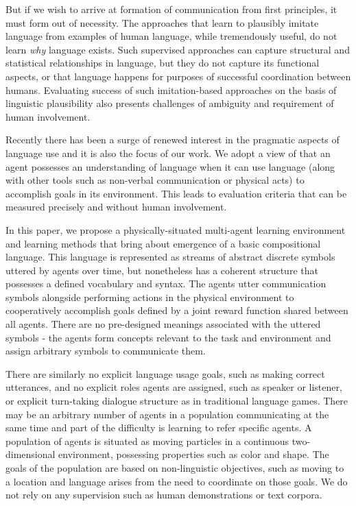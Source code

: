 \documentclass[letterpaper]{article} %
\begin{document}
But if we wish to arrive at formation of communication from first principles, it must form out of necessity. The approaches that learn to plausibly imitate language from examples of human language, while tremendously useful, do not learn \emph{why} language exists. Such supervised approaches can capture structural and statistical relationships in language, but they do not capture its functional aspects, or that language happens for purposes of successful coordination between humans. Evaluating success of such imitation-based approaches on the basis of linguistic plausibility also presents challenges of ambiguity and requirement of human involvement.

Recently there has been a surge of renewed interest in the pragmatic aspects of language use and it is also the focus of our work. We adopt a view of \cite{mordatch16} that an agent possesses an understanding of language when it can use language (along with other tools such as non-verbal communication or physical acts) to accomplish goals in its environment. This leads to evaluation criteria that can be measured precisely and without human involvement. 

In this paper, we propose a physically-situated multi-agent learning environment and learning methods that bring about emergence of a basic compositional language. This language is represented as streams of abstract discrete symbols uttered by agents over time, but nonetheless has a coherent structure that possesses a defined vocabulary and syntax. The agents utter communication symbols alongside performing actions in the physical environment to cooperatively accomplish goals defined by a joint reward function shared between all agents. There are no pre-designed meanings associated with the uttered symbols - the agents form concepts relevant to the task and environment and assign arbitrary symbols to communicate them.

There are similarly no explicit language usage goals, such as making correct utterances, and no explicit roles agents are assigned, such as speaker or listener, or explicit turn-taking dialogue structure as in traditional language games. There may be an arbitrary number of agents in a population communicating at the same time and part of the difficulty is learning to refer specific agents. A population of agents is situated as moving particles in a continuous two-dimensional environment, possessing properties such as color and shape. The goals of the population are based on non-linguistic objectives, such as moving to a location and language arises from the need to coordinate on those goals. We do not rely on any supervision such as human demonstrations or text corpora. 
\end{document}
